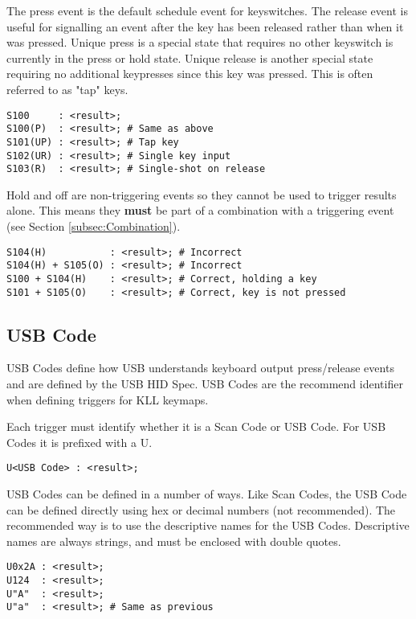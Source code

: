 \documentclass{kiibohd-template}
\begin{document}
The press event is the default schedule event for keyswitches.
The release event is useful for signalling an event after the key has been released rather than when it was pressed.
Unique press is a special state that requires no other keyswitch is currently in the press or hold state.
Unique release is another special state requiring no additional keypresses since this key was pressed.
This is often referred to as "tap" keys.

\begin{lstlisting}
S100     : <result>;
S100(P)  : <result>; # Same as above
S101(UP) : <result>; # Tap key
S102(UR) : <result>; # Single key input
S103(R)  : <result>; # Single-shot on release
\end{lstlisting}

Hold and off are non-triggering events so they cannot be used to trigger results alone.
This means they \textbf{must} be part of a combination with a triggering event (see Section \ref{subsec:Combination}).

\begin{lstlisting}
S104(H)           : <result>; # Incorrect
S104(H) + S105(O) : <result>; # Incorrect
S100 + S104(H)    : <result>; # Correct, holding a key
S101 + S105(O)    : <result>; # Correct, key is not pressed
\end{lstlisting}


\subsection{USB Code}
\label{subsec:USB_Code}

USB Codes define how USB understands keyboard output press/release events and are defined by the USB HID Spec.
USB Codes are the recommend identifier when defining triggers for KLL keymaps.

Each trigger must identify whether it is a Scan Code or USB Code.
For USB Codes it is prefixed with a U.

\begin{lstlisting}
U<USB Code> : <result>;
\end{lstlisting}

USB Codes can be defined in a number of ways.
Like Scan Codes, the USB Code can be defined directly using hex or decimal numbers (not recommended).
The recommended way is to use the descriptive names for the USB Codes.
Descriptive names are always strings, and must be enclosed with double quotes.

\begin{lstlisting}
U0x2A : <result>;
U124  : <result>;
U"A"  : <result>;
U"a"  : <result>; # Same as previous
\end{lstlisting}
\end{document}
